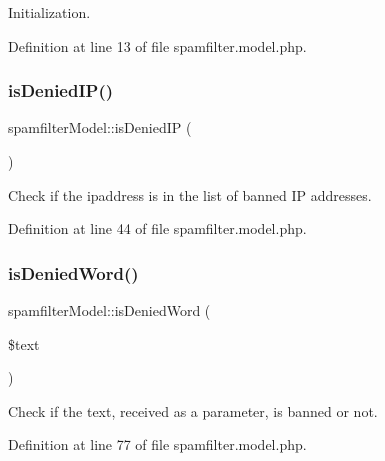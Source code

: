 Initialization. 



Definition at line 13 of file spamfilter.\+model.\+php.

\mbox{\label{classspamfilterModel_a4f657cf632890244b2664acff0ee8706}} 
\subsubsection{\texorpdfstring{is\+Denied\+I\+P()}{isDeniedIP()}}
{\footnotesize\ttfamily spamfilter\+Model\+::is\+Denied\+IP (\begin{DoxyParamCaption}{ }\end{DoxyParamCaption})}



Check if the ipaddress is in the list of banned IP addresses. 



Definition at line 44 of file spamfilter.\+model.\+php.

\mbox{\label{classspamfilterModel_a5661bac60c32b451cbda5f7a9587b13e}} 
\subsubsection{\texorpdfstring{is\+Denied\+Word()}{isDeniedWord()}}
{\footnotesize\ttfamily spamfilter\+Model\+::is\+Denied\+Word (\begin{DoxyParamCaption}\item[{}]{\$text }\end{DoxyParamCaption})}



Check if the text, received as a parameter, is banned or not. 



Definition at line 77 of file spamfilter.\+model.\+php.

\mbox{\label{classspamfilterModel_a6b92cb33d6204158cff0baca2d9f3f4b}} 
